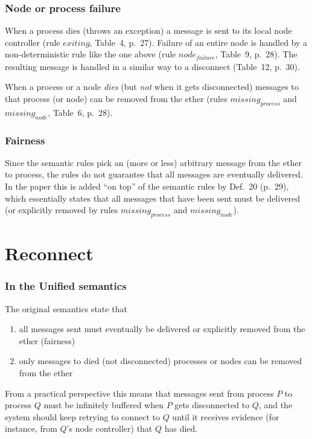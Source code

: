 \documentclass[10pt]{article}
\begin{document}
\subsubsection*{Node or process failure}

When a process dies (throws an exception) a message is sent to its local node
controller (rule $\mathit{exiting}$, Table~4, p.~27). Failure of an entire
node is handled by a non-deterministic rule like the one above (rule
$\mathit{node}_\mathit{failure}$, Table~9, p.~28). The resulting message is
handled in a similar way to a disconnect (Table~12, p.~30).

When a process or a node \emph{dies} (but \emph{not} when it gets disconnected)
messages to that process (or node) can be removed from the ether (rules
$\mathit{missing}_\mathit{process}$ and $\mathit{missing}_\mathit{node}$,
Table~6, p.~28).

\subsubsection*{Fairness}

Since the semantic rules pick an (more or less) arbitrary message from the
ether to process, the rules do not guarantee that all messages are eventually
delivered. In the paper this is added ``on top'' of the semantic rules by Def.~20
(p.~29), which essentially states that all messages that have been sent must be
delivered (or explicitly removed by rules $\mathit{missing}_\mathit{process}$
and $\mathit{missing}_\mathit{node}$).

\section*{Reconnect}

\subsubsection*{In the Unified semantics}

The original semantics state that

\begin{enumerate}
\item all messages sent must eventually be delivered or explicitly removed from the ether (fairness)
\item only messages to died (not disconnected) processes or nodes can be removed from the ether
\end{enumerate}

From a practical perspective this means that messages sent from process $P$ to
process $Q$ must be infinitely buffered when $P$ gets disconnected to $Q$, and
the system should keep retrying to connect to $Q$ until it receives evidence
(for instance, from $Q$'s node controller) that $Q$ has died.
\end{document}
